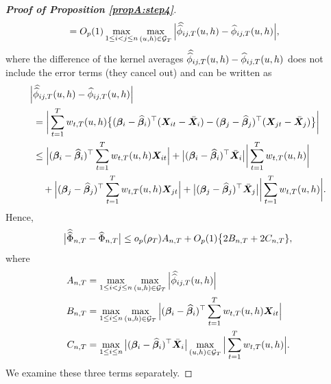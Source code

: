 \documentclass[12pt]{article}
\begin{document}
\begin{proof}[\textnormal{\textbf{Proof of Proposition \ref{propA:step4}}}]
\begin{align*}
 & = O_p(1) \max_{1 \le i < j \le n} \max_{(u,h) \in \mathcal{G}_T} \Big| \doublehat{\phi}_{ij, T}(u,h) - \widehat{\phi}_{ij, T}(u,h) \Big|,
\end{align*}
where the difference of the kernel averages $\doublehat{\phi}_{ij, T}(u,h) - \widehat{\phi}_{ij, T}(u,h) $ does not include the error terms (they cancel out) and can be written as
\begin{align*}
\Big| & \doublehat{\phi}_{ij, T}(u,h) - \widehat{\phi}_{ij, T}(u,h) \Big| \\
 & = \bigg| \sum_{t=1}^T w_{t,T}(u,h) \big\{ (\bfbeta_i - \widehat{\bfbeta}_i)^\top (\X_{it} - \bar{\X}_{i}) - (\bfbeta_j - \widehat{\bfbeta}_j)^\top (\X_{jt} - \bar{\X}_{j}) \big\} \bigg| \\
 & \le \Big|(\bfbeta_i - \widehat{\bfbeta}_i)^\top \sum_{t=1}^T w_{t,T}(u,h) \X_{it} \Big| +  \big|(\bfbeta_i - \widehat{\bfbeta}_i)^\top\bar{\X}_{i}\big| \bigg| \sum_{t=1}^T w_{t,T}(u,h)  \bigg| \\
 & \quad +\Big|(\bfbeta_j - \widehat{\bfbeta}_j)^\top \sum_{t=1}^T w_{t,T}(u,h) \X_{jt}  \Big| + \big|(\bfbeta_j - \widehat{\bfbeta}_j)^\top\bar{\X}_{j}\big| \bigg| \sum_{t=1}^T w_{t,T}(u,h)  \bigg|. 
\end{align*}
Hence,
\begin{equation}\label{ineq-diff-1}
\big| \widehat{\widehat{\Phi}}_{n, T} - \widehat{\Phi}_{n, T} \big| \le o_p( \rho_T) A_{n,T} + O_p(1) \big\{ 2B_{n,T} + 2C_{n,T} \}, 
\end{equation}
where 
\begin{align*}
A_{n,T} & = \max_{1 \le i< j \le n} \max_{(u,h) \in \mathcal{G}_T} \Big|\doublehat{\phi}_{ij,T}(u,h)\Big| \\
B_{n,T} & = \max_{1 \le i \le n} \max_{(u,h) \in \mathcal{G}_T} \Big| (\bfbeta_i - \widehat{\bfbeta}_i)^\top\sum_{t=1}^T w_{t,T}(u,h) \X_{it} \Big| \\
C_{n,T} & = \max_{1 \le i \le n}\big|(\bfbeta_i - \widehat{\bfbeta}_i)^\top\bar{\X}_{i}\big| \max_{(u,h) \in \mathcal{G}_T}  \Big| \sum_{t=1}^T w_{t,T}(u,h)  \Big|. 
\end{align*}
We examine these three terms separately. 



\end{proof}
\end{document}
